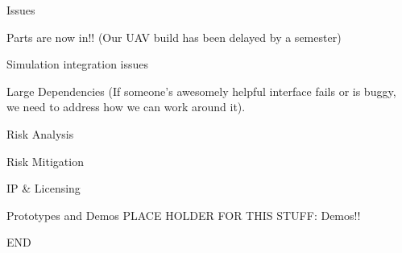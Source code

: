 \documentclass[11pt]{beamer}
\begin{document}
\begin{frame}{Issues}

Parts are now in!! (Our UAV build has been delayed by a semester)

Simulation integration issues

Large Dependencies (If someone's awesomely helpful interface fails or is buggy, we need to address how we can work around it).

\end{frame}

\begin{frame}{Risk Analysis}

\end{frame}

\begin{frame}{Risk Mitigation}

\end{frame}

\begin{frame}{IP \& Licensing}

\end{frame}



\begin{frame}{Prototypes and Demos}
PLACE HOLDER FOR THIS STUFF:
Demos!!
\end{frame}

\begin{frame}{ END}
\end{frame}
\end{document}
